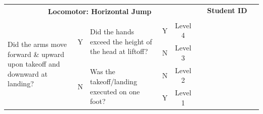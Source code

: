 \documentclass[
  letterpaper,
  DIV=11,
  numbers=noendperiod]{scrartcl}
\begin{document}
\begin{tabular}{|p{5.5cm}|c|p{5.5cm}|c|c|*{9}{p{1.07cm}|}}
\hline
\multicolumn{5}{|c|}{\multirow{2}{*}{\centering \textbf{Locomotor: Horizontal Jump}}} & \multicolumn{9}{c|}{\textbf{Student ID}} \\ 
\cline{6-14}
\multicolumn{5}{|c|}{} & & & & & & & & & \\
\hline
\multirow{4}{5.5cm}{\raggedright {\footnotesize Did the arms move forward \& upward upon takeoff and downward at landing?}} 
& \multirow{2}{*}{\footnotesize Y} 
& \multirow{2}{5cm}{\raggedright {\footnotesize Did the hands exceed the height of the head at liftoff?}} & {\footnotesize Y} & {\footnotesize Level 4} & & & & & & & & & \\
\cline{4-14}
& & & {\footnotesize N} & {\footnotesize Level 3} & & & & & & & & & \\
\cline{2-14}
& \multirow{2}{*}{\footnotesize N} & \multirow{2}{5cm}{\raggedright {\footnotesize Was the takeoff/landing executed on one foot?}} & {\footnotesize N} & {\footnotesize Level 2} & & & & & & & & & \\
\cline{4-14}
& & & {\footnotesize Y} & {\footnotesize Level 1} & & & & & & & & & \\
\hline
\end{tabular}

\vspace{.5em}
\end{document}
